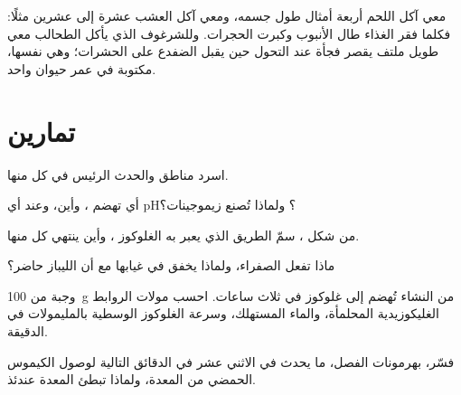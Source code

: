 \begin{remark}\label{rem:b1:digestion-absorption:length}
معي آكل اللحم أربعة أمثال طول جسمه، ومعي آكل العشب عشرة إلى عشرين
مثلًا: فكلما فقر الغذاء طال الأنبوب وكبرت الحجرات. وللشرغوف الذي
يأكل الطحالب معي طويل ملتف يقصر فجأة عند التحول حين يقبل الضفدع
على الحشرات؛ وهي  نفسها، مكتوبة في عمر حيوان واحد.
\end{remark}

\section{تمارين}

\begin{exercise}[$\star$]\label{exo:b1:digestion-absorption:1}
اسرد مناطق  والحدث الرئيس في كل منها.
\end{exercise}

\begin{exercise}[$\star$]\label{exo:b1:digestion-absorption:2}
أي  تهضم ، وأين، وعند أي pH؟ ولماذا تُصنع
زيموجينات؟
\end{exercise}

\begin{exercise}[$\star$]\label{exo:b1:digestion-absorption:3}
من شكل ، سمّ الطريق الذي يعبر به الغلوكوز   ، وأين ينتهي كل منها.
\end{exercise}

\begin{exercise}[$\star$]\label{exo:b1:digestion-absorption:4}
ماذا تفعل الصفراء، ولماذا يخفق   في غيابها مع أن الليباز
حاضر؟
\end{exercise}

\begin{exercise}[$\star\star$]\label{exo:b1:digestion-absorption:5}
وجبة من \qty{100}{g} من النشاء تُهضم إلى غلوكوز في ثلاث ساعات.
احسب مولات الروابط الغليكوزيدية المحلمأة، والماء المستهلك، وسرعة
 الغلوكوز الوسطية بالمليمولات في الدقيقة.
\end{exercise}

\begin{exercise}[$\star\star$]\label{exo:b1:digestion-absorption:6}
فسّر، بهرمونات الفصل، ما يحدث في الاثني عشر في الدقائق التالية
لوصول الكيموس الحمضي  من المعدة، ولماذا تبطئ المعدة عندئذ.
\end{exercise}

